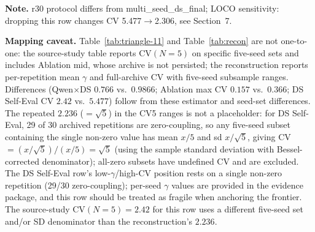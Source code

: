\documentclass[11pt]{article}
\begin{document}
\noindent\textbf{Note.} r30 protocol differs from multi\_seed\_ds\_final; LOCO sensitivity: dropping this row changes CV 5.477$\to$2.306, see Section~7.


\noindent\textbf{Mapping caveat.} Table~\ref{tab:triangle-11} and Table~\ref{tab:recon} are not one-to-one: the source-study table reports $\mathrm{CV}(N{=}5)$ on specific five-seed sets and includes Ablation mid, whose archive is not persisted; the reconstruction reports per-repetition mean $\gamma$ and full-archive $\mathrm{CV}$ with five-seed subsample ranges. Differences (Qwen$\times$DS $0.766$ vs.\ $0.9866$; Ablation max CV $0.157$ vs.\ $0.366$; DS Self-Eval CV $2.42$ vs.\ $5.477$) follow from these estimator and seed-set differences. The repeated $2.236$ ($=\sqrt{5}$) in the CV5 ranges is not a placeholder: for DS Self-Eval, 29 of 30 archived repetitions are zero-coupling, so any five-seed subset containing the single non-zero value has mean $x/5$ and sd $x/\sqrt{5}$, giving CV $= (x/\sqrt{5})/(x/5) = \sqrt{5}$ (using the sample standard deviation with Bessel-corrected denominator); all-zero subsets have undefined CV and are excluded. The DS Self-Eval row's low-$\gamma$/high-$\mathrm{CV}$ position rests on a single non-zero repetition (29/30 zero-coupling); per-seed $\gamma$ values are provided in the evidence package, and this row should be treated as fragile when anchoring the frontier. The source-study $\mathrm{CV}(N{=}5){=}2.42$ for this row uses a different five-seed set and/or SD denominator than the reconstruction's $2.236$.
\end{document}
